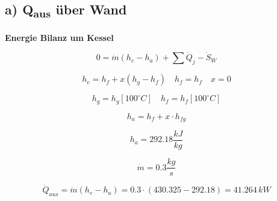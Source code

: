 \subsection*{a) Q\textsubscript{aus} über Wand}

\textbf{Energie Bilanz um Kessel}

\[
0 = \dot{m} \left( h_e - h_a \right) + \sum \dot{Q}_j - \dot{S}_{W}
\]

\[
h_e = h_{f} + x \left( h_{g} - h_{f} \right) \quad h_{f} = h_{f} \quad x = 0
\]

\[
h_{g} = h_{g} \left[ 100^\circ C \right] \quad h_{f} = h_{f} \left[ 100^\circ C \right]
\]

\[
h_a = h_{f} + x \cdot h_{fg}
\]

\[
h_a = 292.18 \frac{kJ}{kg}
\]

\[
\dot{m} = 0.3 \frac{kg}{s}
\]

\[
\dot{Q}_{aus} = \dot{m} \left( h_e - h_a \right) = 0.3 \cdot \left( 430.325 - 292.18 \right) = 41.264 \, kW
\]